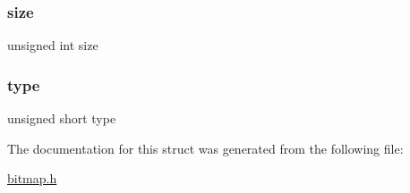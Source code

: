 \mbox{\label{struct_bitmap_file_header_aac913b3a1f6ef005d66bf7a84428773e}} 
\subsubsection{\texorpdfstring{size}{size}}
{\footnotesize\ttfamily unsigned int size}

\mbox{\label{struct_bitmap_file_header_aa929142c5ddf34cf0915c97a617a1a63}} 
\subsubsection{\texorpdfstring{type}{type}}
{\footnotesize\ttfamily unsigned short type}



The documentation for this struct was generated from the following file\+:\begin{DoxyCompactItemize}
\item 
\hyperlink{bitmap_8h}{bitmap.\+h}\end{DoxyCompactItemize}
